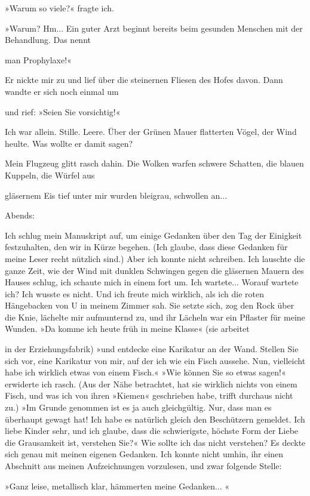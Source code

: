 »Warum so viele?« fragte ich.

»Warum? Hm... Ein guter Arzt beginnt bereits beim gesunden Menschen
mit der Behandlung. Das nennt

man Prophylaxe!«

Er nickte mir zu und lief über die steinernen Fliesen des Hofes
davon. Dann wandte er sich noch einmal um

und rief: »Seien Sie vorsichtig!«

Ich war allein. Stille. Leere. Über der Grünen Mauer flatterten
Vögel, der Wind heulte. Was wollte er damit sagen?

Mein Flugzeug glitt rasch dahin. Die Wolken warfen schwere
Schatten, die blauen Kuppeln, die Würfel aus

gläsernem Eis tief unter mir wurden bleigrau, schwollen an...

Abends:

Ich schlug mein Manuskript auf, um einige Gedanken über den Tag der
Einigkeit festzuhalten, den wir in Kürze begehen. (Ich glaube, dass
diese Gedanken für meine Leser recht nützlich sind.) Aber ich
konnte nicht schreiben. Ich lauschte die ganze Zeit, wie der Wind
mit dunklen Schwingen gegen die gläsernen Mauern des Hauses schlug,
ich schaute mich in einem fort um. Ich wartete... Worauf wartete
ich? Ich wusste es nicht. Und ich freute mich wirklich, als ich die
roten Hängebacken von U in meinem Zimmer sah. Sie setzte sich, zog
den Rock über die Knie, lächelte mir aufmunternd zu, und ihr
Lächeln war ein Pflaster für meine Wunden. »Da komme ich heute früh
in meine Klasse« (sie arbeitet

in der Erziehungsfabrik) »und entdecke eine Karikatur an der Wand.
Stellen Sie sich vor, eine Karikatur von mir, auf der ich wie ein
Fisch aussehe. Nun, vielleicht habe ich wirklich etwas von einem
Fisch.« »Wie können Sie so etwas sagen!« erwiderte ich rasch. (Aus
der Nähe betrachtet, hat sie wirklich nichts von einem Fisch, und
was ich von ihren »Kiemen« geschrieben habe, trifft durchaus nicht
zu.) »Im Grunde genommen ist es ja auch gleichgültig. Nur, dass man
es überhaupt gewagt hat! Ich habe es natürlich gleich den
Beschützern gemeldet. Ich liebe Kinder sehr, und ich glaube, dass
die schwierigste, höchste Form der Liebe die Grausamkeit ist,
verstehen Sie?« Wie sollte ich das nicht verstehen? Es deckte sich
genau mit meinen eigenen Gedanken. Ich konnte nicht umhin, ihr
einen Abschnitt aus meinen Aufzeichnungen vorzulesen, und zwar
folgende Stelle:

»Ganz leise, metallisch klar, hämmerten meine Gedanken... «

